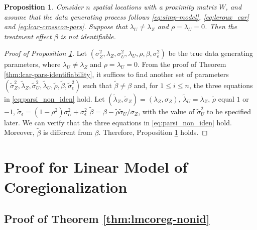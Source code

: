 \documentclass[11pt]{article}
\newtheorem{proposition}{Proposition}
\theoremstyle{definition}
\theoremstyle{remark}
\begin{document}
\begin{proposition}\label{prop:lcar-pars-lambdaU-lambdaZ-unequal-rho-lambdaU-zero}
Consider $n$ spatial locations with a proximity matrix $W$, and assume that the data generating process follows \eqref{eq:simp-model}, \eqref{eq:leroux_car} and \eqref{eq:lcar-crosscov-pars}. Suppose that $\lambda_U\ne \lambda_Z$ and $\rho = \lambda_U = 0$. 
Then the treatment effect $\beta$ is not identifiable.
\end{proposition}

\begin{proof}[Proof of Proposition \ref{prop:lcar-pars-lambdaU-lambdaZ-unequal-rho-lambdaU-zero}]

Let $(\sigma_Z^2, \lambda_Z, \sigma_U^2, \lambda_U, \rho, \beta, \sigma_\epsilon^2)$ be the true data generating parameters, 
where $\lambda_U\ne \lambda_Z$ and $\rho = \lambda_U = 0$.  
From the proof of Theorem \ref{thm:lcar-pars-identifiability}, it suffices to find another set of parameters $(\tilde\sigma_Z^2, \tilde\lambda_Z, \tilde\sigma_U^2, \tilde\lambda_U, \tilde\rho, \tilde\beta, \tilde\sigma_\epsilon^2)$ such that 
$\tilde\beta \ne \beta$ and, for $1\le i \le n$, 
the three equations in \eqref{eq:parsi_non_iden} hold. 
Let $(\tilde{\lambda}_Z, \tilde\sigma_Z) = (\lambda_Z, \sigma_Z)$, 
$\tilde \lambda_U = \lambda_Z$, $\tilde \rho$ equal $1$ or $-1$,
$\tilde \sigma_\epsilon = (1-\rho^2) \sigma^2_U + \sigma^2_\epsilon$
$\tilde{\beta} = \beta - \tilde{\rho} \tilde{\sigma}_U/\sigma_Z$, with the value of $\tilde\sigma_U^2$ to be specified later.
We can verify that the three equations in \eqref{eq:parsi_non_iden} hold. 
Moreover, $\tilde{\beta}$ is different from $\beta$. 
Therefore, Proposition \ref{prop:lcar-pars-lambdaU-lambdaZ-unequal-rho-lambdaU-zero} holds. 
\end{proof}


\section{Proof for Linear Model of Coregionalization}\label{sec:proofs-lmcoreg}

\subsection{Proof of Theorem \ref{thm:lmcoreg-nonid}} 
\end{document}
